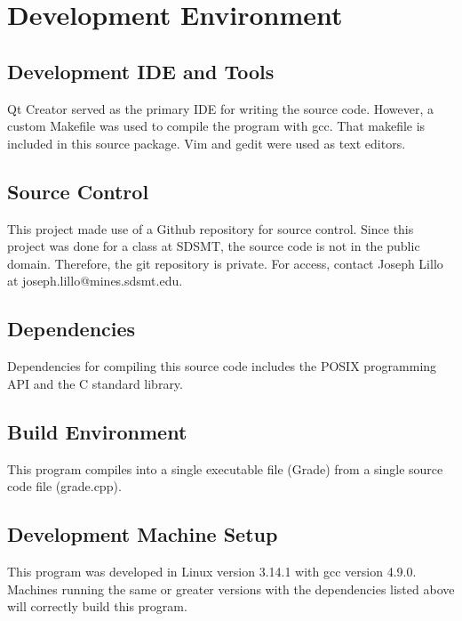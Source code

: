 \chapter{Development Environment}

\section{Development IDE and Tools}
Qt Creator served as the primary IDE for writing the source code. However, a custom Makefile was used to compile the program with gcc. That makefile is included in this source package. Vim and gedit were used as text editors.

\section{Source  Control}
This project made use of a Github repository for source control. Since this project was done for a class at SDSMT, the source code is not in the public domain. Therefore, the git repository is private. For access, contact Joseph Lillo at joseph.lillo@mines.sdsmt.edu.

\section{Dependencies}
Dependencies for compiling this source code includes the POSIX programming API and the C standard library.


\section{Build  Environment}
This program compiles into a single executable file (Grade) from a single source code file (grade.cpp). 

\section{Development Machine Setup}
This program was developed in Linux version 3.14.1 with gcc version 4.9.0.
\\Machines running the same or greater versions with the dependencies listed above will correctly build this program. 

